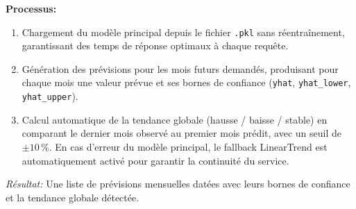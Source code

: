 \begin{itemize}[label=\textbullet]
\begin{itemize}[label=\textbullet]
    \textbf{Processus:}
    \begin{enumerate}
        \item Chargement du modèle principal depuis le fichier 
        \texttt{.pkl} sans réentraînement, garantissant des 
        temps de réponse optimaux à chaque requête.
        \item Génération des prévisions pour les mois futurs 
        demandés, produisant pour chaque mois une valeur 
        prévue et ses bornes de confiance (\texttt{yhat}, 
        \texttt{yhat\_lower}, \texttt{yhat\_upper}).
        \item Calcul automatique de la tendance globale 
        (hausse / baisse / stable) en comparant le dernier 
        mois observé au premier mois prédit, avec un seuil 
        de $\pm 10\,\%$. En cas d'erreur du modèle principal, 
        le fallback LinearTrend est automatiquement activé 
        pour garantir la continuité du service.
    \end{enumerate}
    \textit{Résultat:} Une liste de prévisions mensuelles 
    datées avec leurs bornes de confiance et la tendance 
    globale détectée.

\end{itemize}

       
\end{itemize}




